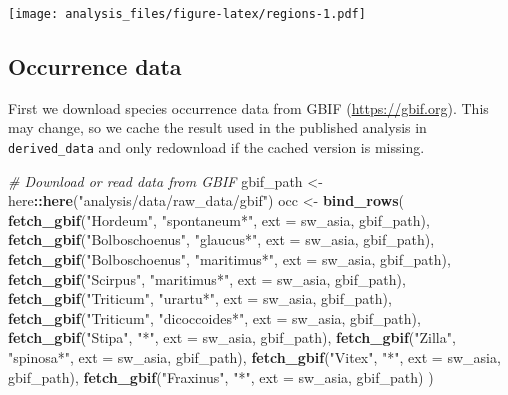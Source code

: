 \documentclass[]{article}
\newenvironment{Shaded}{\begin{snugshade}}{\end{snugshade}}
\newcommand{\CommentTok}[1]{\textcolor[rgb]{0.56,0.35,0.01}{\textit{#1}}}
\newcommand{\DataTypeTok}[1]{\textcolor[rgb]{0.13,0.29,0.53}{#1}}
\newcommand{\KeywordTok}[1]{\textcolor[rgb]{0.13,0.29,0.53}{\textbf{#1}}}
\newcommand{\NormalTok}[1]{#1}
\newcommand{\OperatorTok}[1]{\textcolor[rgb]{0.81,0.36,0.00}{\textbf{#1}}}
\newcommand{\StringTok}[1]{\textcolor[rgb]{0.31,0.60,0.02}{#1}}
\begin{document}
\texttt{[image: analysis\_files/figure-latex/regions-1.pdf]}

\hypertarget{occurrence-data}{%
\subsection{Occurrence data}\label{occurrence-data}}

First we download species occurrence data from GBIF
(\url{https://gbif.org}). This may change, so we cache the result used
in the published analysis in \texttt{derived\_data} and only redownload
if the cached version is missing.

\begin{Shaded}
\begin{Highlighting}[]
\CommentTok{# Download or read data from GBIF}
\NormalTok{gbif_path <-}\StringTok{ }\NormalTok{here}\OperatorTok{::}\KeywordTok{here}\NormalTok{(}\StringTok{"analysis/data/raw_data/gbif"}\NormalTok{)}
\NormalTok{occ <-}\StringTok{ }\KeywordTok{bind_rows}\NormalTok{(}
  \KeywordTok{fetch_gbif}\NormalTok{(}\StringTok{"Hordeum"}\NormalTok{, }\StringTok{"spontaneum*"}\NormalTok{, }\DataTypeTok{ext =}\NormalTok{ sw_asia, gbif_path),}
  \KeywordTok{fetch_gbif}\NormalTok{(}\StringTok{"Bolboschoenus"}\NormalTok{, }\StringTok{"glaucus*"}\NormalTok{, }\DataTypeTok{ext =}\NormalTok{ sw_asia, gbif_path),    }
  \KeywordTok{fetch_gbif}\NormalTok{(}\StringTok{"Bolboschoenus"}\NormalTok{, }\StringTok{"maritimus*"}\NormalTok{, }\DataTypeTok{ext =}\NormalTok{ sw_asia, gbif_path),    }
  \KeywordTok{fetch_gbif}\NormalTok{(}\StringTok{"Scirpus"}\NormalTok{, }\StringTok{"maritimus*"}\NormalTok{, }\DataTypeTok{ext =}\NormalTok{ sw_asia, gbif_path),}
  \KeywordTok{fetch_gbif}\NormalTok{(}\StringTok{"Triticum"}\NormalTok{, }\StringTok{"urartu*"}\NormalTok{, }\DataTypeTok{ext =}\NormalTok{ sw_asia, gbif_path),}
  \KeywordTok{fetch_gbif}\NormalTok{(}\StringTok{"Triticum"}\NormalTok{, }\StringTok{"dicoccoides*"}\NormalTok{, }\DataTypeTok{ext =}\NormalTok{ sw_asia, gbif_path),}
  \KeywordTok{fetch_gbif}\NormalTok{(}\StringTok{"Stipa"}\NormalTok{, }\StringTok{"*"}\NormalTok{, }\DataTypeTok{ext =}\NormalTok{ sw_asia, gbif_path),}
  \KeywordTok{fetch_gbif}\NormalTok{(}\StringTok{"Zilla"}\NormalTok{, }\StringTok{"spinosa*"}\NormalTok{, }\DataTypeTok{ext =}\NormalTok{ sw_asia, gbif_path),}
  \KeywordTok{fetch_gbif}\NormalTok{(}\StringTok{"Vitex"}\NormalTok{, }\StringTok{"*"}\NormalTok{, }\DataTypeTok{ext =}\NormalTok{ sw_asia, gbif_path),}
  \KeywordTok{fetch_gbif}\NormalTok{(}\StringTok{"Fraxinus"}\NormalTok{, }\StringTok{"*"}\NormalTok{, }\DataTypeTok{ext =}\NormalTok{ sw_asia, gbif_path)}
\NormalTok{)}
\end{Highlighting}
\end{Shaded}
\end{document}
